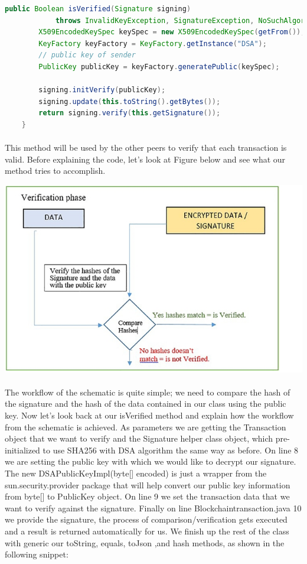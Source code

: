 \documentclass[12pt,a4paper]{report}
\begin{document}
\begin{lstlisting}[language=Java]
public Boolean isVerified(Signature signing)
            throws InvalidKeyException, SignatureException, NoSuchAlgorithmException, InvalidKeySpecException {
        X509EncodedKeySpec keySpec = new X509EncodedKeySpec(getFrom());
        KeyFactory keyFactory = KeyFactory.getInstance("DSA");
        // public key of sender
        PublicKey publicKey = keyFactory.generatePublic(keySpec);

        signing.initVerify(publicKey);
        signing.update(this.toString().getBytes());
        return signing.verify(this.getSignature());
    }

\end{lstlisting}
\paragraph{}

This method will be used by the other peers to verify that each transaction is valid. Before explaining the code, let’s look at Figure below and see what our method tries to accomplish.


\includegraphics[width=\textwidth]{image2.jpeg}
\paragraph{}


The workflow of the schematic is quite simple; we need to compare the hash of the signature and the hash of the data contained in our class using the public key.
Now let’s look back at our isVerified method and explain how the workflow from the schematic is achieved. As parameters we are getting the Transaction object that we want to verify and the Signature helper class object, which pre-initialized to use SHA256 with DSA algorithm the same way as before. On line 8 we are setting the public key with which we would like to decrypt our signature. The new DSAPublicKeyImpl(byte[] encoded) is just a wrapper from the sun.security.provider package that will help convert our public key information from byte[] to PublicKey object. On line 9 we set the transaction data that we want to verify against the signature. Finally on line Blockchaintransaction.java 10 we provide the signature, the process of comparison/verification gets executed and a result is returned automatically for us.
We finish up the rest of the class with generic our toString, equals, toJson ,and hash methods, as shown in the following snippet:
\end{document}

